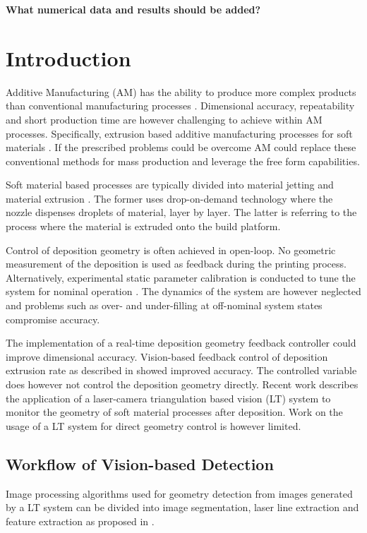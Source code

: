 \documentclass[10pt,letter]{article}
\begin{document}
\textbf{What numerical data and results should be added?}


\section{Introduction}

Additive Manufacturing (AM) has the ability to produce more complex products than conventional manufacturing processes \cite{stucker2010additive}. Dimensional accuracy, repeatability and short production time are however challenging to achieve within AM processes. Specifically, extrusion based additive manufacturing processes for soft materials \cite{liravi2017additive}. If the prescribed problems could be overcome AM could replace these conventional methods for mass production and leverage the free form capabilities. 

Soft material based processes are typically divided into material jetting and material extrusion \cite{calignano2017overview}. The former uses drop-on-demand technology where the nozzle dispenses droplets of material, layer by layer. The latter is referring to the process where the material is extruded onto the build platform. 

Control of deposition geometry is often achieved in open-loop. No geometric measurement of the deposition is used as feedback during the printing process. Alternatively, experimental static parameter calibration is conducted to tune the system for nominal operation \cite{magnoni2017robotic}. The dynamics of the system are however neglected and problems such as over- and under-filling at off-nominal system states compromise accuracy.

The implementation of a real-time deposition geometry feedback controller could improve dimensional accuracy. Vision-based feedback control of deposition extrusion rate as described in \cite{hoelzle2008iterative} showed improved accuracy. The controlled variable does however not control the deposition geometry directly. Recent work \cite{faes2016process} describes the application of a laser-camera triangulation based vision (LT) system to monitor the geometry of soft material processes after deposition. Work on the usage of a LT system for direct geometry control is however limited. 

\subsection{Workflow of Vision-based Detection}
Image processing algorithms used for geometry detection from images generated by a LT system can be divided into image segmentation, laser line extraction and feature extraction as proposed in \cite{li2007recent}.
\end{document}
